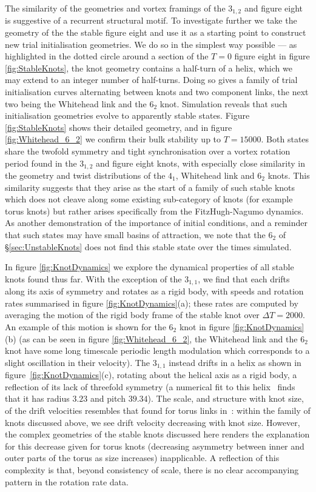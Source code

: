 The similarity of the geometries and vortex framings of the $3_{1,2}$ and figure eight is suggestive of a recurrent structural motif. To investigate further we take the geometry of the the stable figure eight and use it as a starting point to construct new trial initialisation geometries. We do so in the simplest way possible --- as highlighted in the dotted circle around a section of the $T=0$ figure eight in figure \ref{fig:StableKnots}, the knot geometry contains a half-turn of a helix, which we may extend to an integer number of half-turns. Doing so gives a family of trial initialisation curves alternating between knots and two component links, the next two being the Whitehead link and the $6_2$ knot. Simulation reveals that such initialisation geometries evolve to apparently stable states. Figure \ref{fig:StableKnots} shows their detailed geometry, and in figure \ref{fig:Whitehead_6_2} we confirm their bulk stability up to $T=15000$. Both states share the twofold symmetry and tight synchronisation over a vortex rotation period found in the $3_{1,2}$ and figure eight knots, with especially close similarity in the geometry and twist distributions of the $4_1$, Whitehead link and $6_2$ knots. This similarity suggests that they arise as the start of a family of such stable knots which does not cleave along some existing sub-category of knots (for example torus knots) but rather arises specifically from the FitzHugh-Nagumo dynamics. As another demonstration of the importance of initial conditions, and a reminder that such states may have small basins of attraction, we note that the $6_2$ of \S \ref{sec:UnstableKnots} does not find this stable state over the times simulated.

In figure \ref{fig:KnotDynamics} we explore the dynamical properties of all stable knots found thus far. With the exception of the $3_{1,1}$, we find that each drifts along its axis of symmetry and rotates as a rigid body, with speeds and rotation rates summarised in figure \ref{fig:KnotDynamics}(a); these rates are computed by averaging the motion of the rigid body frame of the stable knot over $\Delta T = 2000$. An example of this motion is shown for the $6_2$ knot in figure \ref{fig:KnotDynamics}(b) (as can be seen in figure \ref{fig:Whitehead_6_2}, the Whitehead link and the $6_2$ knot have some long timescale periodic length modulation which corresponds to a slight oscillation in their velocity). The $3_{1,1}$ instead drifts in a helix as shown in figure~\ref{fig:KnotDynamics}(c), rotating about the helical axis as a rigid body, a reflection of its lack of threefold symmetry (a numerical fit to this helix~\citep{Enkhbayar2008} finds that it has radius $3.23$ and pitch $39.34$). The scale, and structure with knot size, of the drift velocities resembles that found for torus links in~\citep{Maucher2019}: within the family of knots discussed above, we see drift velocity decreasing with knot size. However, the complex geometries of the stable knots discussed here renders the explanation for this decrease given for torus knots (decreasing asymmetry between inner and outer parts of the torus as size increases) inapplicable. A reflection of this complexity is that, beyond consistency of scale, there is no clear accompanying pattern in the rotation rate data.


